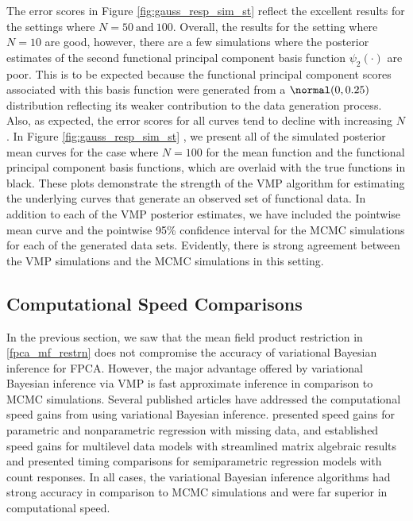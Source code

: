 \documentclass[12pt]{article}
\theoremstyle{plain}
\theoremstyle{definition}
\theoremstyle{remark}
\begin{document}
The error scores in Figure \ref{fig:gauss_resp_sim_st}  reflect the excellent results for the
settings where $N = 50 \ \text{and} \ 100$. Overall, the results for the setting where $N = 10$ are good, however,
there are a few simulations where the posterior estimates of the second functional principal component basis
function $\psi_2 (\cdot)$ are poor. This is to be expected because the functional principal component scores
associated with this basis function were generated from a $\normal (0, 0.25)$ distribution reflecting its weaker
contribution to the data generation process. Also, as expected, the error scores for all curves tend to decline with
increasing $N$. In Figure \ref{fig:gauss_resp_sim_st} , we present all of the simulated
posterior mean curves for the case where $N = 100$
for the mean function and the functional principal component basis functions, which are
overlaid with the true functions in black. These plots demonstrate the strength of the VMP algorithm for estimating
the underlying curves that generate an observed set of functional data. In addition to each of the VMP posterior
estimates, we have included the pointwise mean curve and the pointwise 95\% confidence interval for the MCMC
simulations for each of the generated data sets. Evidently, there is strong agreement between the VMP simulations
and the MCMC simulations in this setting.


\subsection{Computational Speed Comparisons}
\label{sec:speed_comp}

In the previous section, we saw that the mean field product restriction in \eqref{fpca_mf_restrn} does not
compromise the accuracy of variational Bayesian inference for FPCA. However,
the major advantage offered by variational Bayesian inference via VMP is fast approximate inference in 
comparison to MCMC simulations. Several published articles have addressed the computational speed gains
from using variational Bayesian inference.  presented speed gains for parametric and nonparametric
regression with missing data,  and  established speed gains for multilevel data models
with streamlined matrix algebraic results and  presented timing comparisons for semiparametric regression
models with count responses. In all cases, the variational Bayesian inference algorithms had strong accuracy in
comparison to MCMC simulations and were far superior in computational speed.
\end{document}
